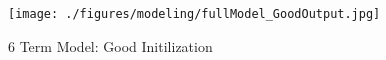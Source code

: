 \begin{figure}
\texttt{[image: ./figures/modeling/fullModel\_GoodOutput.jpg]}
\centering
\caption{6 Term Model: Good Initilization}
\label{fig:fullModel_GoodOutput}
\end{figure}
